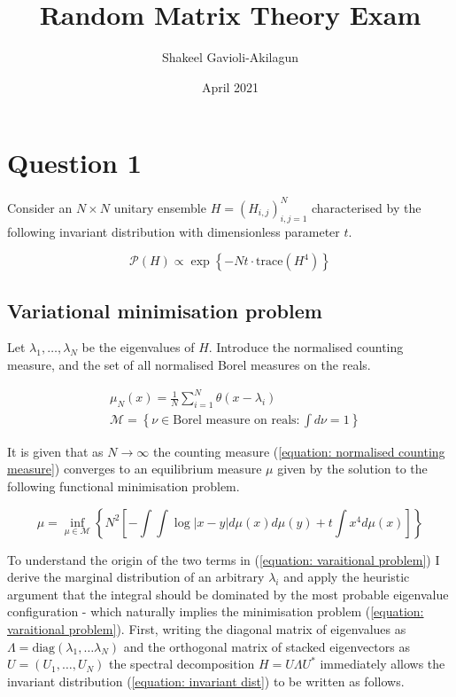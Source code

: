\documentclass{article}
\title{Random Matrix Theory Exam}
\author{Shakeel Gavioli-Akilagun}
\date{April 2021}
\begin{document}
\maketitle

\section*{Question 1}

Consider an $N \times N$ unitary ensemble $H = \left ( H_{i,j} \right )_{i,j = 1}^N$ characterised by the following invariant distribution with dimensionless parameter $t$. 

\begin{equation}
	\mathcal{P} \left( H \right) \propto \exp \left \{ - Nt \cdot \text{trace} \left( H^4 \right) \right \} 
	\label{equation: invariant dist}
\end{equation}

\subsection*{Variational minimisation problem}

Let $\lambda_1, \dots, \lambda_N$ be the eigenvalues of $H$. Introduce the normalised counting measure, and the set of all normalised Borel measures on the reals.  

\begin{align}
	& \mu_N \left( x \right) = \frac{1}{N} \sum_{i=1}^N \theta \left( x - \lambda_i \right)
	\label{equation: normalised counting measure} \\ 
	& \mathcal{M} = \left \{ \nu \in \text{Borel measure on reals} : \int d \nu = 1 \right \}
\end{align}

It is given that as $N \rightarrow \infty$ the counting measure (\ref{equation: normalised counting measure}) converges to an equilibrium measure $\mu$ given by the solution to the following functional minimisation problem. 

\begin{equation}
	\mu = \inf_{\mu \in \mathcal{M}} \left \{ N^2 \left [-\int\int \log \left | x-y \right | d\mu (x) d \mu (y) + t \int x^4 d \mu (x) \right ] \right \}
	\label{equation: varaitional problem}
\end{equation}

To understand the origin of the two terms in (\ref{equation: varaitional problem}) I derive the marginal distribution of an arbitrary $\lambda_i$ and apply the heuristic argument that the integral should be dominated by the most probable eigenvalue configuration - which naturally implies the minimisation problem (\ref{equation: varaitional problem}). First, writing the diagonal matrix of eigenvalues as $\Lambda = \text{diag} \left ( \lambda_1, \dots \lambda_N \right )$ and the orthogonal matrix of stacked eigenvectors as $U = \left ( U_1, \dots, U_N \right )$ the spectral decomposition $H = U \Lambda U^*$ immediately allows the invariant distribution (\ref{equation: invariant dist}) to be written as follows. 
\end{document}
